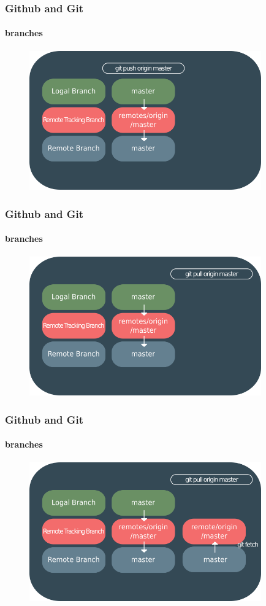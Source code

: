 \documentclass{beamer}
\begin{document}
	\begin{frame}
		\frametitle{Github and Git}
		\framesubtitle{branches}
		\begin{figure}[htbp]
			\centering
			\includegraphics[width=10cm]{remotebranch4}
		\end{figure}
	\end{frame}
	
	\begin{frame}
		\frametitle{Github and Git}
		\framesubtitle{branches}
		\begin{figure}[htbp]
			\centering
			\includegraphics[width=10cm]{remotebranch5}
		\end{figure}
	\end{frame}
	
	\begin{frame}
		\frametitle{Github and Git}
		\framesubtitle{branches}
		\begin{figure}[htbp]
			\centering
			\includegraphics[width=10cm]{remotebranch7}
		\end{figure}
	\end{frame}
	
\end{document}

